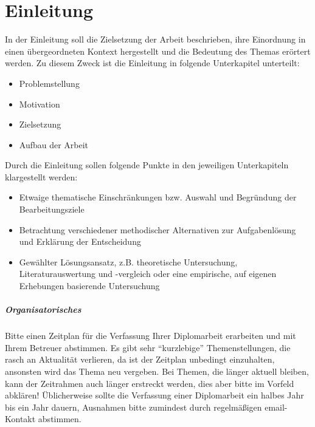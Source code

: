 \chapter{Einleitung}
\label{sec:introduction}

In der Einleitung soll die Zielsetzung der Arbeit beschrieben, ihre Einordnung in einen übergeordneten Kontext hergestellt und die Bedeutung des Themas erörtert werden. Zu diesem Zweck ist die Einleitung in folgende Unterkapitel unterteilt:
\begin{itemize}
	\item Problemstellung
	\item Motivation
	\item Zielsetzung
	\item Aufbau der Arbeit
\end{itemize}

\makeatletter
\ifthesis@masterthesis
Durch die Einleitung sollen folgende Punkte in den jeweiligen Unterkapiteln klargestellt werden:
\begin{itemize}
	\item Etwaige thematische Einschränkungen bzw. Auswahl und Begründung der Bearbeitungsziele
	\item Betrachtung verschiedener methodischer Alternativen zur Aufgabenlösung und Erklärung der Entscheidung
	\item Gewählter Lösungsansatz, z.B. theoretische Untersuchung, Literaturauswertung und -vergleich oder eine empirische, auf eigenen Erhebungen basierende Untersuchung
\end{itemize}
\fi
\makeatother

\paragraph{Organisatorisches}
\makeatletter\ifthesis@masterthesis
Bitte einen Zeitplan für die Verfassung Ihrer Diplomarbeit erarbeiten und mit Ihrem Betreuer abstimmen. Es gibt sehr \enquote{kurzlebige} Themenstellungen, die rasch an Aktualität verlieren, da ist der Zeitplan unbedingt einzuhalten, ansonsten wird das Thema neu vergeben. Bei Themen, die länger aktuell bleiben, kann der Zeitrahmen auch länger erstreckt werden, dies aber bitte im Vorfeld abklären! Üblicherweise sollte die Verfassung einer Diplomarbeit ein halbes Jahr bis ein Jahr dauern, Ausnahmen bitte zumindest durch regelmäßigen email-Kontakt abstimmen.
\fi\makeatother


